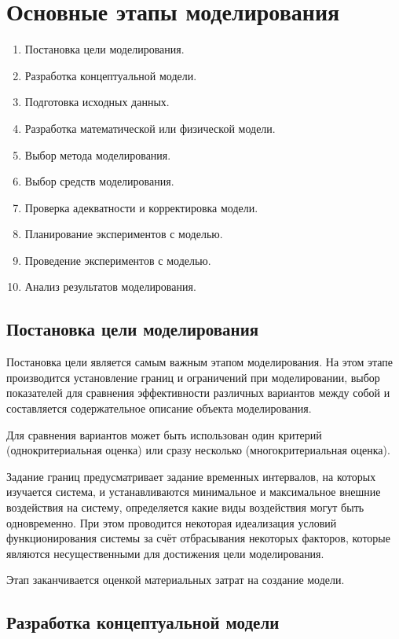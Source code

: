 \documentclass[12pt, russian, oneside, article]{ncc}
\begin{document}
\section{Основные этапы моделирования}
\label{sec-4}


\begin{enumerate}
\item Постановка цели моделирования.
\item Разработка концептуальной модели.
\item Подготовка исходных данных.
\item Разработка математической или физической модели.
\item Выбор метода моделирования.
\item Выбор средств моделирования.
\item Проверка адекватности и корректировка модели.
\item Планирование экспериментов с моделью.
\item Проведение экспериментов с моделью.
\item Анализ результатов моделирования.
\end{enumerate}
\subsection{Постановка цели моделирования}
\label{sec-4_1}


Постановка цели является самым важным этапом моделирования. На этом этапе производится установление границ и ограничений при моделировании, выбор показателей для сравнения эффективности различных вариантов между собой и составляется содержательное описание объекта моделирования.

Для сравнения вариантов может быть использован один критерий (однокритериальная оценка) или сразу несколько (многокритериальная оценка).

Задание границ предусматривает задание временных интервалов, на которых изучается система, и устанавливаются минимальное и максимальное внешние воздействия на систему, определяется какие виды воздействия могут быть одновременно. При этом проводится некоторая идеализация условий функционирования системы за счёт отбрасывания некоторых факторов, которые являются несущественными для достижения цели моделирования.

Этап заканчивается оценкой материальных затрат на создание модели.
\subsection{Разработка концептуальной модели}
\label{sec-4_2}
\end{document}
